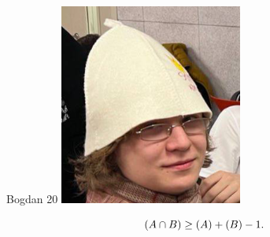 \documentclass[12pt]{article}
\let\P\relax
\DeclareMathOperator{\P}{\mathbb{P}}
\begin{document}
\begin{minipage}{0.45\textwidth}
\begin{tinderm}{Bogdan 20}
\includegraphics[width=\textwidth]{tinder-photo/bogdan.png}

  

\begin{mybox}
\[
\P(A \cap B) \ge \P(A) + \P(B) - 1.
\]
\end{mybox}
\end{tinderm}
\end{minipage}
\end{document}
